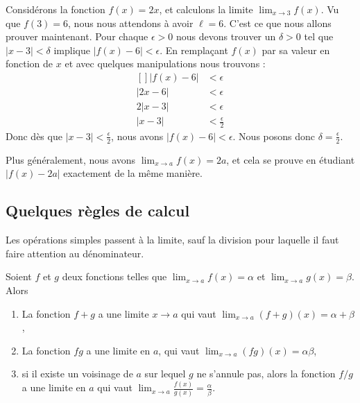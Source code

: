 \begin{example}
	Considérons la fonction \( f(x)=2x\), et calculons la limite \( \lim_{x\to 3} f(x)\). Vu que \( f(3)=6\), nous nous attendons à avoir \( \ell=6\). C'est ce que nous allons prouver maintenant. Pour chaque \( \epsilon>0\) nous devons trouver un \( \delta>0\) tel que \( | x-3 |<\delta\) implique \( | f(x)-6 |<\epsilon\). En remplaçant \( f(x)\) par sa valeur en fonction de \( x\) et avec quelques manipulations nous trouvons :
	\begin{equation}
		\begin{aligned}[]
			| f(x)-6 | & <\epsilon                \\
			| 2x-6 |   & <\epsilon                \\
			2| x-3 |   & <\epsilon                \\
			| x-3 |    & <\frac{ \epsilon }{2}
		\end{aligned}
	\end{equation}
	Donc dès que \( | x-3 |<\frac{ \epsilon }{2}\), nous avons \( | f(x)-6 |<\epsilon\). Nous posons donc \( \delta=\frac{ \epsilon }{2}\).

	Plus généralement, nous avons \( \lim_{x\to a} f(x)=2a\), et cela se prouve en étudiant \( | f(x)-2a |\) exactement de la même manière.
\end{example}

\subsection{Quelques règles de calcul}

Les opérations simples passent à la limite, sauf la division pour laquelle il faut faire attention au dénominateur.
\begin{proposition}     \label{PropOpsSimplesLimites}
	Soient \( f\) et \( g\) deux fonctions telles que \( \lim_{x\to a} f(x)=\alpha\) et \( \lim_{x\to a} g(x)=\beta\). Alors
	\begin{enumerate}
        \item   \label{ITEMooOJUWooQpqqnQ}
            La fonction \( f+g\) a une limite \( x\to a\) qui vaut \( \lim_{x\to a} (f+g)(x)=\alpha+\beta\),
		\item
            La fonction \( fg\) a une limite en \( a\), qui vaut \( \lim_{x\to a} (fg)(x)=\alpha\beta\),
		\item
            si il existe un voisinage de \( a\) sur lequel \( g\) ne s'annule pas, alors la fonction \( f/g\) a une limite en \( a\) qui vaut \( \lim_{x\to a} \frac{ f(x) }{ g(x) }=\frac{ \alpha }{ \beta }\).
	\end{enumerate}
\end{proposition}

